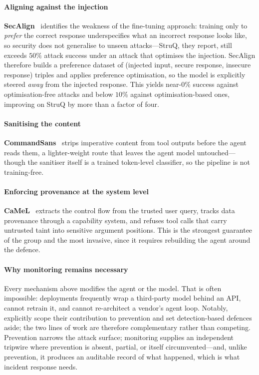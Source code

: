 \documentclass[preprint,12pt,number]{elsarticle}
\theoremstyle{definition}
\begin{document}
\paragraph{Aligning against the injection}
\textbf{SecAlign}~\citep{chen2025secalign} identifies the weakness of the
fine-tuning approach: training only to \emph{prefer} the correct response
underspecifies what an incorrect response looks like, so security does not
generalise to unseen attacks---StruQ, they report, still exceeds $50\%$ attack
success under an attack that optimises the injection. SecAlign therefore builds a
preference dataset of (injected input, secure response, insecure response) triples
and applies preference optimisation, so the model is explicitly steered
\emph{away} from the injected response. This yields near-$0\%$ success against
optimisation-free attacks and below $10\%$ against optimisation-based ones,
improving on StruQ by more than a factor of four.

\paragraph{Sanitising the content}
\textbf{CommandSans}~\citep{das2025commandsans} strips imperative content from
tool outputs before the agent reads them, a lighter-weight route that leaves the
agent model untouched---though the sanitiser itself is a trained token-level
classifier, so the pipeline is not training-free.

\paragraph{Enforcing provenance at the system level}
\textbf{CaMeL}~\citep{debenedetti2025camel} extracts the control flow from the
trusted user query, tracks data provenance through a capability system, and
refuses tool calls that carry untrusted taint into sensitive argument positions.
This is the strongest guarantee of the group and the most invasive, since it
requires rebuilding the agent around the defence.

\paragraph{Why monitoring remains necessary}
Every mechanism above modifies the agent or the model. That is often impossible:
deployments frequently wrap a third-party model behind an API, cannot retrain it,
and cannot re-architect a vendor's agent loop. Notably, \citet{chen2025secalign}
explicitly scope their contribution to prevention and set detection-based defences
aside; the two lines of work are therefore complementary rather than competing.
Prevention narrows the attack surface; monitoring supplies an independent tripwire
where prevention is absent, partial, or itself circumvented---and, unlike
prevention, it produces an auditable record of what happened, which is what
incident response needs.
\end{document}
